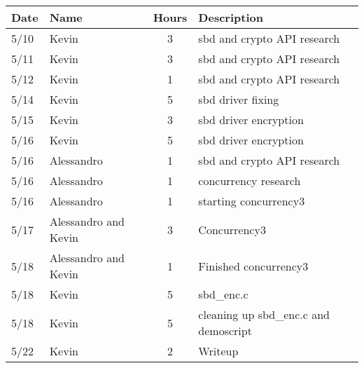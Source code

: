 \begin{tabular}{l l c l}\textbf{Date} & \textbf{Name} & \textbf{Hours} & \textbf{Description}\\\hline
5/10 & Kevin & 3 & sbd and crypto API research\\\hline
5/11 & Kevin & 3 & sbd and crypto API research\\\hline
5/12 & Kevin & 1 & sbd and crypto API research\\\hline
5/14 & Kevin & 5 & sbd driver fixing\\\hline
5/15 & Kevin & 3 & sbd driver encryption\\\hline
5/16 & Kevin & 5 & sbd driver encryption\\\hline
5/16 & Alessandro & 1 & sbd and crypto API research\\\hline
5/16 & Alessandro & 1 & concurrency research\\\hline
5/16 & Alessandro & 1 & starting concurrency3\\\hline
5/17 & Alessandro and Kevin & 3 & Concurrency3\\\hline
5/18 & Alessandro and Kevin & 1 & Finished
concurrency3\\\hline
5/18 & Kevin &5 & sbd\_enc.c\\\hline
5/18 & Kevin &5 & cleaning up sbd\_enc.c and demoscript\\\hline
5/22 & Kevin &2 & Writeup\\\hline
\end{tabular}